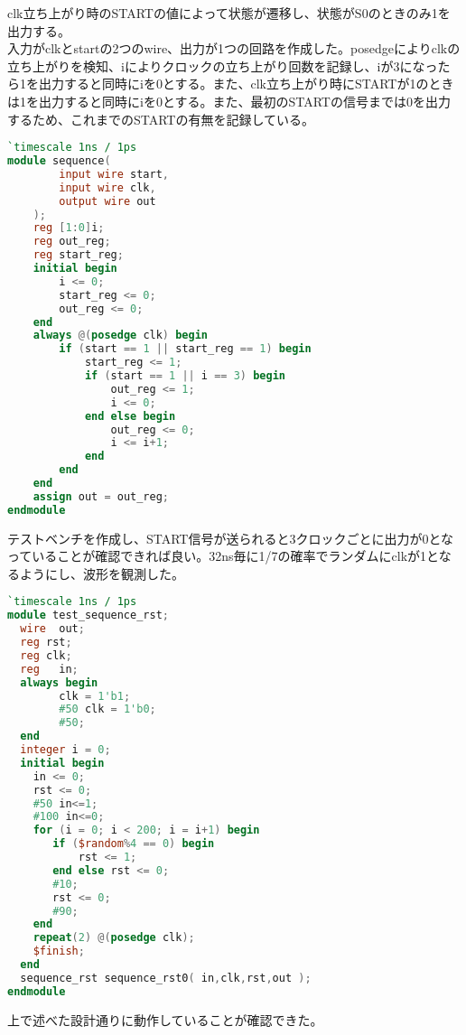 \documentclass{ltjsarticle}
\begin{document}
clk立ち上がり時のSTARTの値によって状態が遷移し、状態がS0のときのみ1を出力する。\\
入力がclkとstartの2つのwire、出力が1つの回路を作成した。posedgeによりclkの立ち上がりを検知、iによりクロックの立ち上がり回数を記録し、iが3になったら1を出力すると同時にiを0とする。また、clk立ち上がり時にSTARTが1のときは1を出力すると同時にiを0とする。また、最初のSTARTの信号までは0を出力するため、これまでのSTARTの有無を記録している。
\begin{lstlisting}[caption=順序回路デザイン,language=verilog]
`timescale 1ns / 1ps
module sequence(
        input wire start,
        input wire clk,
        output wire out
    );
    reg [1:0]i;
    reg out_reg;
    reg start_reg;
    initial begin
        i <= 0;
        start_reg <= 0;
        out_reg <= 0;
    end
    always @(posedge clk) begin
        if (start == 1 || start_reg == 1) begin
            start_reg <= 1;
            if (start == 1 || i == 3) begin 
                out_reg <= 1;
                i <= 0;
            end else begin
                out_reg <= 0;
                i <= i+1;
            end
        end
    end
    assign out = out_reg;
endmodule
\end{lstlisting}
テストベンチを作成し、START信号が送られると3クロックごとに出力が0となっていることが確認できれば良い。32ns毎に1/7の確率でランダムにclkが1となるようにし、波形を観測した。
\begin{lstlisting}[caption=順序回路テストベンチ,language=verilog]
`timescale 1ns / 1ps
module test_sequence_rst;
  wire	out;
  reg rst;
  reg clk;
  reg	in;
  always begin
        clk = 1'b1;
        #50 clk = 1'b0;
        #50;
  end
  integer i = 0;
  initial begin
	in <= 0;
	rst <= 0;
	#50 in<=1;
	#100 in<=0;
	for (i = 0; i < 200; i = i+1) begin
	   if ($random%4 == 0) begin
	       rst <= 1;
	   end else rst <= 0;
	   #10;
	   rst <= 0;
	   #90;
	end
	repeat(2) @(posedge clk);
	$finish;
  end
  sequence_rst sequence_rst0( in,clk,rst,out );
endmodule
\end{lstlisting}
上で述べた設計通りに動作していることが確認できた。
\end{document}

